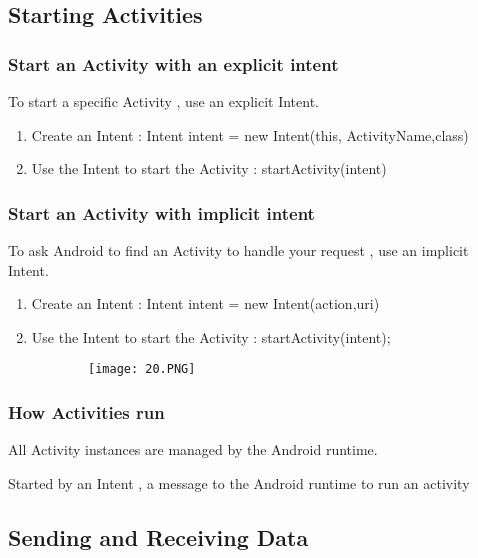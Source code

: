 \documentclass{article}
\begin{document}
  \subsection{Starting Activities}

  \subsubsection{Start an Activity with an explicit intent}

  To start a specific Activity , use an explicit Intent.

  \begin{enumerate}
      \item Create an Intent : Intent intent = new Intent(this, ActivityName,class)
      \item Use the Intent to start the Activity : startActivity(intent)
  \end{enumerate}

\subsubsection{Start an Activity with implicit intent}

To ask Android to find an Activity to handle your request , use an implicit Intent.

\begin{enumerate}
    \item Create an Intent : Intent intent = new Intent(action,uri)
    \item Use the Intent to start the Activity : startActivity(intent);
\end{enumerate}

      \begin{figure}[ht!]
  \centering
  \begin{subfigure}[b]{0.6\linewidth}
    \texttt{[image: 20.PNG]}
  \end{subfigure}
  \end{figure}

  \subsubsection{How Activities run}

  All Activity instances are managed by the Android runtime.

  Started by an Intent , a message to the Android runtime to run an activity

  \subsection{Sending and Receiving Data}
\end{document}
